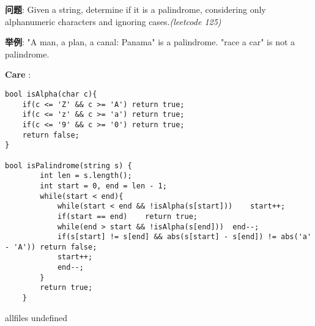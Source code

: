 \documentclass{article}
\begin{document}
\begin{CJK}{UTF8}{gbsn}     %

\else
    
\begin{description}
    \item{\textbf{问题}}: Given a string, determine if it is a palindrome, considering only alphanumeric characters and ignoring cases.\textit{(leetcode 125)}

	\item{\textbf{举例}}: "A man, a plan, a canal: Panama" is a palindrome. "race a car" is not a palindrome. 
    \item{\textbf{Care}} : 
    \begin{lstlisting}
bool isAlpha(char c){
	if(c <= 'Z' && c >= 'A') return true;
	if(c <= 'z' && c >= 'a') return true;
	if(c <= '9' && c >= '0') return true;
	return false;
}

bool isPalindrome(string s) {
		int len = s.length();
		int start = 0, end = len - 1;
		while(start < end){
			while(start < end && !isAlpha(s[start]))	start++;
			if(start == end)	return true;
			while(end > start && !isAlpha(s[end]))	end--;
			if(s[start] != s[end] && abs(s[start] - s[end]) != abs('a' - 'A')) return false;
			start++;
			end--;
		}
		return true;
	}
    \end{lstlisting}
\end{description}

\fi

\ifx allfiles undefined
\end{CJK}
\end{document}
